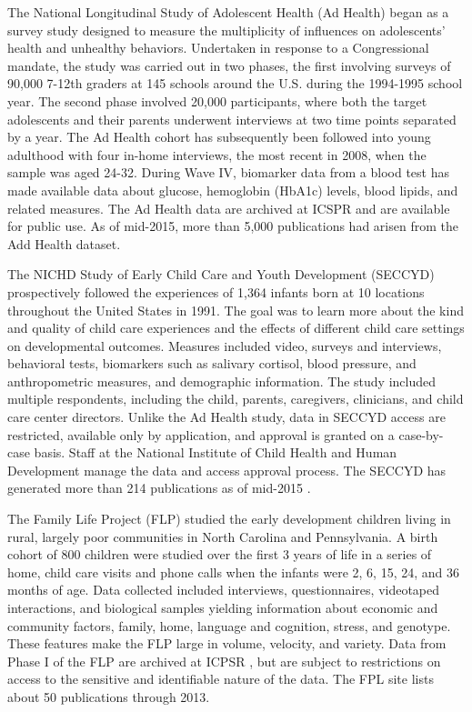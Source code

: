 \documentclass[letterpaper,man,apacite]{apa6}
\begin{document}
The National Longitudinal Study of Adolescent Health (Ad Health) \cite{adolescent_health} began as a survey study designed to measure the multiplicity of influences on adolescents' health and unhealthy behaviors. 
Undertaken in response to a Congressional mandate, the study was carried out in two phases, the first involving surveys of 90,000 7-12th graders at 145 schools around the U.S. during the 1994-1995 school year. 
The second phase involved 20,000 participants, where both the target adolescents and their parents underwent interviews at two time points separated by a year. 
The Ad Health cohort has subsequently been followed into young adulthood with four in-home interviews, the most recent in 2008, when the sample was aged 24-32.
During Wave IV, biomarker data from a blood test has made available data about glucose, hemoglobin (HbA1c) levels, blood lipids, and related measures. 
The Ad Health data \cite{harris_add_health} are archived at ICSPR \cite{ICPSR} and are available for public use.
As of mid-2015, more than 5,000 publications \cite{add_health_publications} had arisen from the Add Health dataset.

The NICHD Study of Early Child Care and Youth Development (SECCYD) prospectively followed the experiences of 1,364 infants born at 10 locations throughout the United States in 1991.
The goal was to learn more about the kind and quality of child care experiences and the effects of different child care settings on developmental outcomes. 
Measures included video, surveys and interviews, behavioral tests, biomarkers such as salivary cortisol, blood pressure, and anthropometric measures, and demographic information.
The study included multiple respondents, including the child, parents, caregivers, clinicians, and child care center directors.
Unlike the Ad Health study, data in SECCYD access are restricted, available only by application, and approval is granted on a case-by-case basis.
Staff at the National Institute of Child Health and Human Development manage the data and access approval process.
The SECCYD has generated more than 214 publications as of mid-2015 \cite{seccyd_publications}.

The Family Life Project (FLP) studied the early development children living in rural, largely poor communities in North Carolina and Pennsylvania. 
A birth cohort of 800 children were studied over the first 3 years of life in a series of home, child care visits and phone calls when the infants were 2, 6, 15, 24, and 36 months of age. 
Data collected included interviews, questionnaires, videotaped interactions, and biological samples yielding information about economic and community factors, family, home, language and cognition, stress, and genotype.
These features make the FLP large in volume, velocity, and variety.
Data from Phase I of the FLP are archived at ICPSR \cite{Family_Life_data}, but are subject to restrictions on access to the sensitive and identifiable nature of the data.
The FPL site lists about 50 publications through 2013.
\end{document}

